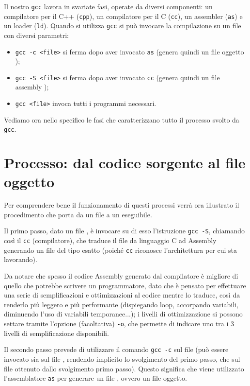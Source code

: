 \documentclass[class=book, crop=false, oneside]{standalone}
\begin{document}
Il nostro \texttt{gcc} lavora in svariate fasi, operate da diversi componenti: un compilatore per il C++ (\texttt{cpp}), un compilatore per il C (\texttt{cc}), un assembler (\texttt{as}) e un loader (\texttt{ld}).
Quando si utilizza \texttt{gcc} si può invocare la compilazione su un file con diversi parametri:
\begin{itemize}
	\item \texttt{gcc -c <file>} si ferma dopo aver invocato \texttt{as} (genera quindi un file oggetto );
	\item \texttt{gcc -S <file>} si ferma dopo aver invocato \texttt{cc} (genera quindi un file assembly );
	\item \texttt{gcc <file>} invoca tutti i programmi necessari.
\end{itemize}
Vediamo ora nello specifico le fasi che caratterizzano tutto il processo svolto da \texttt{gcc}.

\section{Processo: dal codice sorgente al file oggetto}
Per comprendere bene il funzionamento di questi processi verrà ora illustrato il procedimento che porta da un file  a un eseguibile.

Il primo passo, dato un file , è invocare su di esso l'istruzione \texttt{gcc -S}, chiamando così il \texttt{cc} (compilatore), che traduce il file da linguaggio C ad Assembly generando un file  del tipo esatto (poiché \texttt{cc} riconosce l'architettura per cui sta lavorando).

Da notare che spesso il codice Assembly generato dal compilatore è migliore di quello che potrebbe scrivere un programmatore, dato che è pensato per effettuare una serie di semplificazioni e ottimizzazioni al codice mentre lo traduce, così da renderlo più leggero e più performante (dispiegando loop, accorpando variabili, diminuendo l'uso di variabili temporanee...); i livelli di ottimizzazione si possono settare tramite l'opzione (facoltativa) \texttt{-o}, che permette di indicare uno tra i \(3\) livelli di semplificazione disponibili.

Il secondo passo prevede di utilizzare il comando \texttt{gcc -c} sul file (può essere invocato sia sul file , rendendo implicito lo svolgimento del primo passo, che sul file  ottenuto dallo svolgimento primo passo). Questo significa che viene utilizzato l'assemblatore \texttt{as} per generare un file , ovvero un file oggetto.
\end{document}
